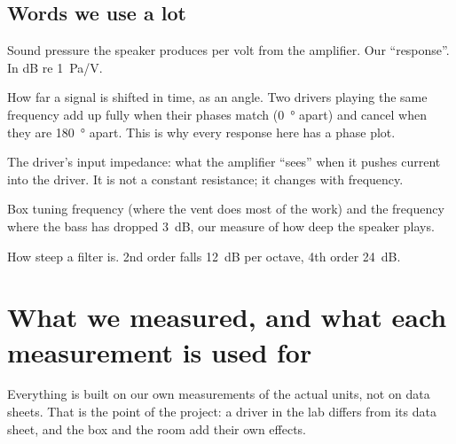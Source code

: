 \documentclass[a4paper,10pt]{article}
\begin{document}
\subsection{Words we use a lot}
\begin{description}[leftmargin=2.4cm,labelwidth=2.2cm,style=sameline]
\item[$p/V$] Sound pressure the speaker produces per volt from the amplifier. Our ``response''. In dB
  re \SI{1}{Pa/V}.
\item[Phase] How far a signal is shifted in time, as an angle. Two drivers playing the same
  frequency add up fully when their phases match (\SI{0}{\degree} apart) and cancel when they are
  \SI{180}{\degree} apart. This is why every response here has a phase plot.
\item[$Z_i$] The driver's input impedance: what the amplifier ``sees'' when it pushes current into
  the driver. It is not a constant resistance; it changes with frequency.
\item[$f_B$, $f_3$] Box tuning frequency (where the vent does most of the work) and the
  frequency where the bass has dropped \SI{3}{dB}, our measure of how deep the speaker plays.
\item[Order] How steep a filter is. 2nd order falls \SI{12}{dB} per octave, 4th order \SI{24}{dB}.
\end{description}

\section{What we measured, and what each measurement is used for}

Everything is built on our own measurements of the actual units, not on data sheets. That is the
point of the project: a driver in the lab differs from its data sheet, and the box and the room add
their own effects.
\end{document}
